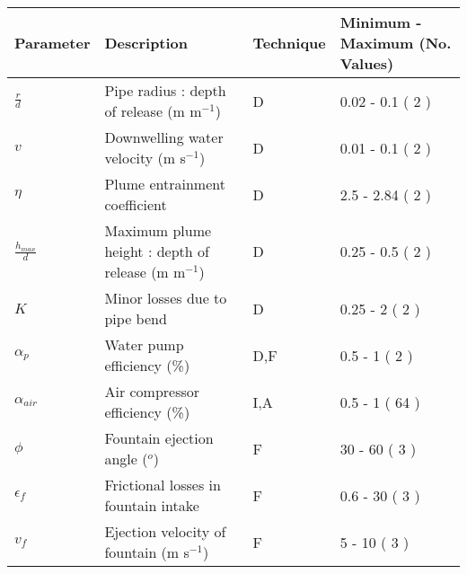 \documentclass[12pt]{standalone}
\begin{document}
\begin{table}[ht]
\centering
\begin{tabular}{llll}
  \hline
Parameter & Description & Technique & Minimum - Maximum (No. Values) \\ 
  \hline
$\frac{r}{d}$ & Pipe radius : depth of release (m m$^{-1}$) & D & 0.02 - 0.1  ( 2 ) \\ 
  $v$ & Downwelling water velocity (m s$^{-1}$) & D & 0.01 - 0.1  ( 2 ) \\ 
  $\eta$ & Plume entrainment coefficient & D & 2.5 - 2.84  ( 2 ) \\ 
  $\frac{h_{max}}{d}$ & Maximum plume height : depth of release (m m$^{-1}$) & D & 0.25 - 0.5  ( 2 ) \\ 
  $K$ & Minor losses due to pipe bend & D & 0.25 - 2  ( 2 ) \\ 
  $\alpha_p$ & Water pump efficiency (\%) & D,F & 0.5 - 1  ( 2 ) \\ 
  $\alpha_{air}$ & Air compressor efficiency (\%) & I,A & 0.5 - 1  ( 64 ) \\ 
  $\phi$ & Fountain ejection angle ($^o$) & F & 30 - 60  ( 3 ) \\ 
  $\epsilon_f$ & Frictional losses in fountain intake & F & 0.6 - 30  ( 3 ) \\ 
  $v_f$ & Ejection velocity of fountain (m s$^{-1}$) & F & 5 - 10  ( 3 ) \\ 
   \hline
\end{tabular}
\end{table}
\end{document}
